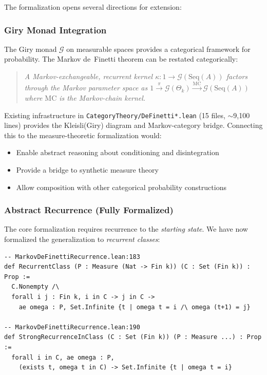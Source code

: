 \documentclass[11pt,a4paper]{article}
\theoremstyle{definition}
\begin{document}
The formalization opens several directions for extension:

\subsubsection{Giry Monad Integration}

The Giry monad $\mathcal{G}$ on measurable spaces provides a categorical
framework for probability. The Markov de~Finetti theorem can be restated
categorically:

\begin{quote}
\emph{A Markov-exchangeable, recurrent kernel $\kappa : 1 \to \mathcal{G}(\mathrm{Seq}(A))$
factors through the Markov parameter space as
$1 \xrightarrow{\pi} \mathcal{G}(\Theta_k) \xrightarrow{\mathrm{MC}} \mathcal{G}(\mathrm{Seq}(A))$
where $\mathrm{MC}$ is the Markov-chain kernel.}
\end{quote}

Existing infrastructure in \texttt{CategoryTheory/DeFinetti*.lean} (15 files,
$\sim$9,100 lines) provides the Kleisli(Giry) diagram and Markov-category
bridge. Connecting this to the measure-theoretic formalization would:
\begin{itemize}
\item Enable abstract reasoning about conditioning and disintegration
\item Provide a bridge to synthetic measure theory
\item Allow composition with other categorical probability constructions
\end{itemize}

\subsubsection{Abstract Recurrence (Fully Formalized)}

The core formalization requires recurrence to the \emph{starting state}.
We have now formalized the generalization to \emph{recurrent classes}:

\begin{lstlisting}
-- MarkovDeFinettiRecurrence.lean:183
def RecurrentClass (P : Measure (Nat -> Fin k)) (C : Set (Fin k)) : Prop :=
  C.Nonempty /\
  forall i j : Fin k, i in C -> j in C ->
    ae omega : P, Set.Infinite {t | omega t = i /\ omega (t+1) = j}

-- MarkovDeFinettiRecurrence.lean:190
def StrongRecurrenceInClass (C : Set (Fin k)) (P : Measure ...) : Prop :=
  forall i in C, ae omega : P,
    (exists t, omega t in C) -> Set.Infinite {t | omega t = i}
\end{lstlisting}
\end{document}

